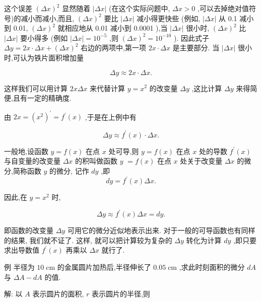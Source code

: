 \documentclass[lang=cn,newtx,10pt,scheme=chinese]{elegantbook}
\begin{document}
这个误差 \({\left( \Delta x\right) }^{2}\) 显然随着 \(\left| {\Delta x}\right|\) (在这个实际问题中, \({\Delta x} > 0\) ,可以去掉绝对值符号)的减小而减小,而且, \({\left( \Delta x\right) }^{2}\) 要比 \(\left| {\Delta x}\right|\) 减小得更快些 (例如, \(\left| {\Delta x}\right|\) 从 0.1 减小到 0.01, \({\left( \Delta x\right) }^{2}\) 就相应地从 0.01 减小到 0.0001 ),当 \(\left| {\Delta x}\right|\) 很小时, \({\left( \Delta x\right) }^{2}\) 比 \(\left| {\Delta x}\right|\) 要小得多 (例如 \(\left| {\Delta x}\right| = {10}^{-5}\) ,则 \({\left( \Delta x\right) }^{2} = {10}^{-{10}}\) ). 因此式子 \({\Delta y} = {2x} \cdot {\Delta x} + {\left( \Delta x\right) }^{2}\) 右边的两项中,第一项 \({2x} \cdot {\Delta x}\) 是主要部分. 当 \(\left| {\Delta x}\right|\) 很小时,可认为铁片面积增加量

\[
{\Delta y} \approx {2x} \cdot {\Delta x}.
\]

这样我们可以用计算 \({2x\Delta x}\) 来代替计算 \(y = {x}^{2}\) 的改变量 \({\Delta y}\) ,这比计算 \({\Delta y}\) 来得简便,且有一定的精确度.

由 \({2x} = {\left( {x}^{2}\right) }^{\prime } = {f}^{\prime }\left( x\right)\) ,于是在上例中有

\[
{\Delta y} \approx {f}^{\prime }\left( x\right) \cdot {\Delta x}. \tag{1'}
\]

\begin{definition}[微分]
一般地,设函数 \(y = f\left( x\right)\) 在点 \(x\) 处可导,则 \(y = f\left( x\right)\) 在点 \(x\) 处的导数 \({f}^{\prime }\left( x\right)\) 与自变量的改变量 \({\Delta x}\) 的积叫做函数 \(y\) \(= f\left( x\right)\) 在点 \(x\) 处关于改变量 \({\Delta x}\) 的微分,简称函数 \(y\) 的微分, 记作 \({dy}\) ,即
\[
{dy} = {f}^{\prime }\left( x\right) {\Delta x}. \tag{2}
\]
\end{definition}

因此,在 \(y = {x}^{2}\) 时,

\[
{\Delta y} \approx {f}^{\prime }\left( x\right) {\Delta x} = {dy}. \tag{2'}
\]


即函数的改变量 \({\Delta y}\) 可用它的微分近似地表示出来. 对于一般的可导函数也有同样的结果, 我们就不证了. 这样, 就可以把计算较为复杂的 \({\Delta y}\) 转化为计算 \({dy}\) ,即只要求出导数值 \({f}^{\prime }\left( x\right)\) 再乘以 \({\Delta x}\) 就行了.

例 半径为 \({10}\mathrm{\;{cm}}\) 的金属圆片加热后,半径伸长了 \({0.05}\mathrm{\;{cm}}\) ,求此时刻面积的微分 \({dA}\) 与 \({\Delta A} - {dA}\) 的值.

解: 以 \(A\) 表示圆片的面积, \(r\) 表示圆片的半径,则
\end{document}
